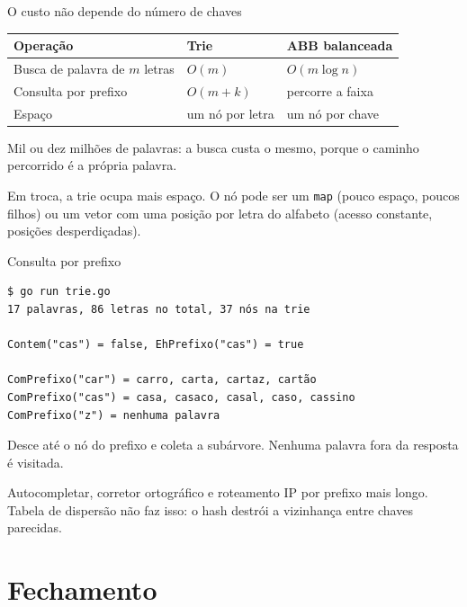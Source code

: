 \documentclass{beamer}
\begin{document}
\begin{frame}{O custo não depende do número de chaves}
	\begin{center}
		\small
		\begin{tabular}{lll}
			\toprule
			\textbf{Operação}              & \textbf{Trie}   & \textbf{ABB balanceada} \\
			\midrule
			Busca de palavra de $m$ letras & $O(m)$          & $O(m \log n)$           \\
			Consulta por prefixo           & $O(m + k)$      & percorre a faixa        \\
			Espaço                         & um nó por letra & um nó por chave         \\
			\bottomrule
		\end{tabular}
	\end{center}

	\vspace{0.4cm}
	Mil ou dez milhões de palavras: a busca custa o mesmo, porque o caminho
	percorrido é a própria palavra.

	\vspace{0.3cm}
	Em troca, a trie ocupa mais espaço. O nó pode ser um \texttt{map} (pouco
	espaço, poucos filhos) ou um vetor com uma posição por letra do alfabeto
	(acesso constante, posições desperdiçadas).
\end{frame}

\begin{frame}[fragile]{Consulta por prefixo}
	\begin{verbatim}
$ go run trie.go
17 palavras, 86 letras no total, 37 nós na trie

Contem("cas") = false, EhPrefixo("cas") = true

ComPrefixo("car") = carro, carta, cartaz, cartão
ComPrefixo("cas") = casa, casaco, casal, caso, cassino
ComPrefixo("z") = nenhuma palavra
\end{verbatim}

	\vspace{0.2cm}
	Desce até o nó do prefixo e coleta a subárvore. Nenhuma palavra fora da
	resposta é visitada.

	\vspace{0.2cm}
	Autocompletar, corretor ortográfico e roteamento IP por prefixo mais longo.
	Tabela de dispersão não faz isso: o hash destrói a vizinhança entre chaves
	parecidas.
\end{frame}

\section{Fechamento}
\end{document}

